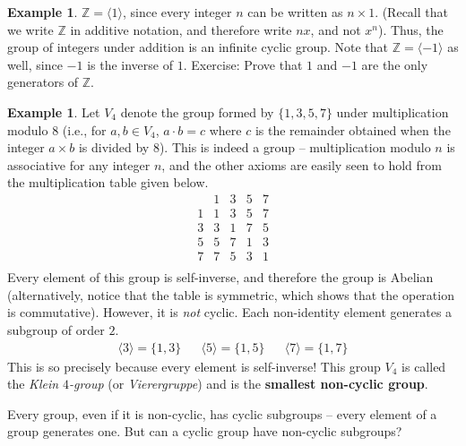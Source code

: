 \documentclass[svgnames]{article}
\theoremstyle{definition}
\newtheorem{Example}[Theorem]{Example}
\theoremstyle{remark}
\begin{document}
\begin{Example}
$\mathbb Z = \langle 1 \rangle$, since every integer $n$ can be written as $n \times 1$. (Recall that we write $\mathbb Z$ in additive notation, and therefore write $nx$, and not $x^n$). Thus, the group of integers under addition is an infinite cyclic group. Note that $\mathbb Z = \langle -1 \rangle$ as well, since $-1$ is the inverse of $1$. {\small Exercise: Prove that $1$ and $-1$ are the only generators of $\mathbb Z$}.
\end{Example}

\begin{Example}\label{ex:V4}
Let $V_4$ denote the group formed by $\{1, 3, 5, 7\}$ under multiplication modulo $8$ (i.e., for $a, b \in V_4$, $a \cdot b = c$ where $c$ is the remainder obtained when the integer $a \times b$ is divided by $8$). This is indeed a group -- multiplication modulo $n$ is associative for any integer $n$, and the other axioms are easily seen to hold from the multiplication table given below.
\begin{equation*}
\begin{array}{c|cccc}
	&	1	&	3	&	5	&	7\\
\hline
1	&	1	&	3	&	5	&	7\\
3	&	3	&	1	&	7	&	5\\
5	&	5	&	7	&	1	&	3\\
7	&	7	&	5	&	3	&	1\\
\end{array}
\end{equation*}
Every element of this group is self-inverse, and therefore the group is Abelian (alternatively, notice that the table is symmetric, which shows that the operation is commutative). However, it is \emph{not} cyclic. Each non-identity element generates a subgroup of order $2$.
\begin{align*}
\langle 3 \rangle = \{1, 3\} && \langle 5 \rangle = \{1, 5\} && \langle 7 \rangle = \{1, 7\}
\end{align*}
This is so precisely because every element is self-inverse! This group $V_4$ is called the \emph{Klein $4$-group} (or \emph{Vierergruppe}) and is the \textbf{smallest non-cyclic group}.
\end{Example}

Every group, even if it is non-cyclic, has cyclic subgroups -- every element of a group generates one. But can a cyclic group have non-cyclic subgroups?
\end{document}
